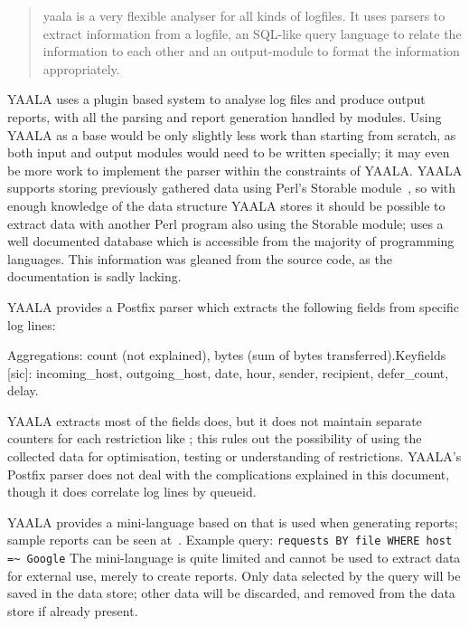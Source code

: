 \begin{quotation}

    yaala is a very flexible analyser for all kinds of logfiles. It uses
    parsers to extract information from a logfile, an SQL-like query
    language to relate the information to each other and an output-module
    to format the information appropriately.

\end{quotation}

YAALA uses a plugin based system to analyse log files and produce \HTML{}
output reports, with all the parsing and report generation handled by
modules.  Using YAALA as a base would be only slightly less work than
starting from scratch, as both input and output modules would need to be
written specially; it may even be more work to implement the parser within
the constraints of YAALA\@.  YAALA supports storing previously gathered
data using Perl's Storable module~\cite{perl-storable}, so with enough
knowledge of the data structure YAALA stores it should be possible to
extract data with another Perl program also using the Storable module;
\parsername{} uses a well documented database which is accessible from the
majority of programming languages.  This information was gleaned from the
source code, as the documentation is sadly lacking.

YAALA provides a Postfix parser which extracts the following fields from
specific log lines:

\noindent\tab{}Aggregations: count (not explained), bytes (sum of bytes
transferred).\newline \tab{}Keyfields [sic]: incoming\_host,
outgoing\_host, date, hour, sender, recipient, defer\_count, delay.

YAALA extracts most of the fields \parsername{} does, but it does not
maintain separate counters for each restriction like \parsername{}; this
rules out the possibility of using the collected data for  optimisation,
testing or understanding of restrictions.  YAALA's Postfix parser does not
deal with the complications explained in this document, though it does
correlate log lines by queueid.

YAALA provides a mini-language based on \SQL{} that is used when generating
reports; sample reports can be seen at~\cite{yaala-samples}.  Example
query: \newline \tab{} \texttt{requests BY file WHERE host =\~{} Google}
\newline The mini-language is quite limited and cannot be used to extract
data for external use, merely to create reports.  Only data selected by the
query will be saved in the data store; other data will be discarded, and
removed from the data store if already present.

